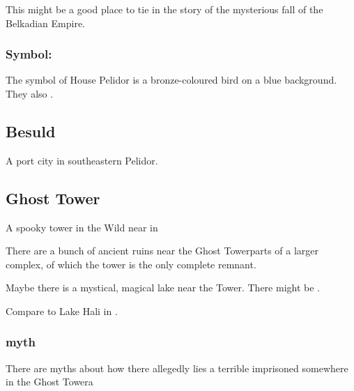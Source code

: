 This might be a good place to tie in the story of the mysterious fall of the Belkadian Empire. 









\subsubsection{Symbol: \Grulcan}
\label{Pelidor symbol}
The symbol of House Pelidor is a bronze-coloured \hs{\grulcan} bird on a blue background. They also . 









\subsection{Besuld}
A port city in southeastern Pelidor. 









\subsection{Ghost Tower}
\label{Ghost Tower}
A spooky tower in the Wild near \hs{\Forklin} in 

There are a bunch of ancient ruins near the Ghost Tower\dash parts of a larger complex, of which the tower is the only complete remnant. 

\label{Mystic lake near the Ghost Tower}
Maybe there is a mystical, magical lake near the Tower. 
There might be .

Compare to Lake Hali in \RWCTKIY. 





\subsubsection{\Haskelek{} myth}
\label{Haskelek myth}
\label{\Haskelek{} myth}
There are myths about how there allegedly lies a terrible \daemon{} imprisoned somewhere in the Ghost Tower\dash a \hs\Haskelek











